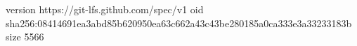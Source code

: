 version https://git-lfs.github.com/spec/v1
oid sha256:08414691ea3abd85b620950ea63c662a43c43be280185a0ca333e3a33233183b
size 5566
